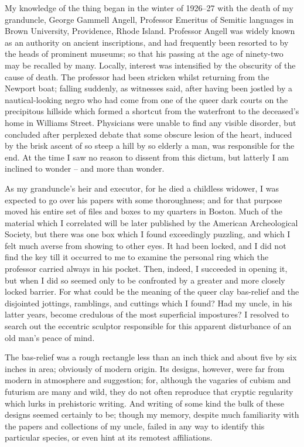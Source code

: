 My knowledge of the thing began in the winter of 1926⁠–⁠27 with the death of my granduncle, George Gammell Angell, Professor Emeritus of Semitic languages in Brown University, Providence, Rhode Island. Professor Angell was widely known as an authority on ancient inscriptions, and had frequently been resorted to by the heads of prominent museums; so that his passing at the age of ninety-two may be recalled by many. Locally, interest was intensified by the obscurity of the cause of death. The professor had been stricken whilst returning from the Newport boat; falling suddenly, as witnesses said, after having been jostled by a nautical-looking negro who had come from one of the queer dark courts on the precipitous hillside which formed a shortcut from the waterfront to the deceased’s home in Williams Street. Physicians were unable to find any visible disorder, but concluded after perplexed debate that some obscure lesion of the heart, induced by the brisk ascent of so steep a hill by so elderly a man, was responsible for the end. At the time I saw no reason to dissent from this dictum, but latterly I am inclined to wonder⁠ – and more than wonder.

As my granduncle’s heir and executor, for he died a childless widower, I was expected to go over his papers with some thoroughness; and for that purpose moved his entire set of files and boxes to my quarters in Boston. Much of the material which I correlated will be later published by the American Archeological Society, but there was one box which I found exceedingly puzzling, and which I felt much averse from showing to other eyes. It had been locked, and I did not find the key till it occurred to me to examine the personal ring which the professor carried always in his pocket. Then, indeed, I succeeded in opening it, but when I did so seemed only to be confronted by a greater and more closely locked barrier. For what could be the meaning of the queer clay bas-relief and the disjointed jottings, ramblings, and cuttings which I found? Had my uncle, in his latter years, become credulous of the most superficial impostures? I resolved to search out the eccentric sculptor responsible for this apparent disturbance of an old man’s peace of mind.

The bas-relief was a rough rectangle less than an inch thick and about five by six inches in area; obviously of modern origin. Its designs, however, were far from modern in atmosphere and suggestion; for, although the vagaries of cubism and futurism are many and wild, they do not often reproduce that cryptic regularity which lurks in prehistoric writing. And writing of some kind the bulk of these designs seemed certainly to be; though my memory, despite much familiarity with the papers and collections of my uncle, failed in any way to identify this particular species, or even hint at its remotest affiliations.


